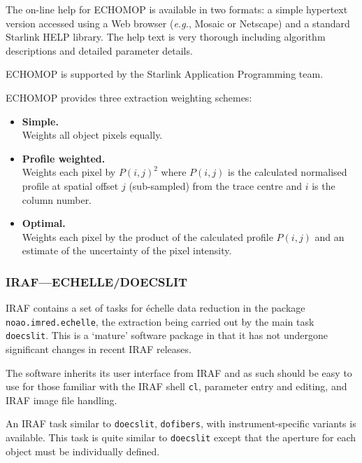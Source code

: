 \documentclass[twoside,11pt]{article}
\newcommand{\xlabel}[1]{}
\newcommand{\sgspec}[2]{#1}
\newcommand{\sgspec}[2]{#2}
\begin{document}
The on-line help for ECHOMOP is available in two formats: a simple
hypertext version accessed using a Web browser ({\em{e.g.}}, Mosaic or
Netscape) and a standard Starlink HELP library.  The help text is very
thorough including algorithm descriptions and detailed parameter details.

ECHOMOP is supported by the Starlink Application Programming team.

ECHOMOP provides three extraction weighting schemes:

\begin{itemize}

\item {\bf{Simple.}} \mbox{}\\
      Weights all object pixels equally.

\item {\bf{Profile weighted.}} \mbox{}\\
      Weights each pixel by $P(i, j)^{2}$ where $P(i,j)$ is the
      calculated normalised profile at spatial offset $j$ (sub-sampled)
      from the trace centre and $i$ is the column number.

\item {\bf{Optimal.}} \mbox{}\\
      Weights each pixel by the product of the calculated profile
      $P(i,j)$ and an estimate of the uncertainty of the pixel intensity.

\end{itemize}

\subsubsection{\xlabel{doecslit}\label{se_doecslit}IRAF\sgspec{---}{ - }ECHELLE/DOECSLIT}

IRAF contains a set of tasks for \'{e}chelle data reduction in the package
{\tt noao.imred.echelle}, the extraction being carried out by the main task
{\tt doecslit}\@.  This is a `mature' software package in that it has not
undergone significant changes in recent IRAF releases.

The software inherits its user interface from IRAF and as such should be
easy to use for those familiar with the IRAF shell {\tt cl}, parameter
entry and editing, and IRAF image file handling.

An IRAF task similar to {\tt doecslit}, {\tt dofibers}, with
instrument-specific variants is available.  This task is quite similar to
{\tt doecslit} except that the aperture for each object must be
individually defined.
\end{document}
